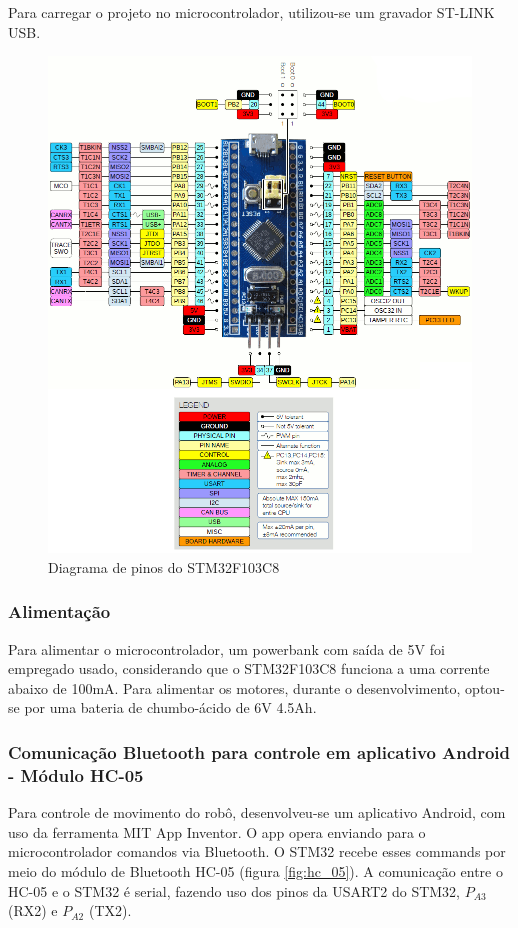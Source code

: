 Para carregar o projeto no microcontrolador, utilizou-se um gravador ST-LINK USB.

\begin{figure}[htb]
	\centering
	\includegraphics[width=1.0\textwidth]{figures/stm32f1_pinout}
	\caption{Diagrama de pinos do STM32F103C8}
\end{figure}

\subsubsection{Alimentação}
Para alimentar o microcontrolador, um powerbank com saída de 5V foi empregado usado, considerando que o STM32F103C8 
funciona a uma corrente abaixo de 100mA. Para alimentar os motores, durante o desenvolvimento, optou-se por uma 
bateria de chumbo-ácido de 6V 4.5Ah.

\subsubsection{Comunicação Bluetooth para controle em aplicativo Android - Módulo HC-05}
Para controle de movimento do robô, desenvolveu-se um aplicativo Android, com uso da ferramenta MIT App Inventor. O app opera enviando para o microcontrolador comandos via Bluetooth. O STM32 recebe esses commands por meio 
do módulo de Bluetooth HC-05 (figura \ref{fig:hc_05}). A comunicação entre o HC-05 e o STM32 é serial, fazendo uso 
dos pinos da USART2 do STM32, $P_{A3}$ (RX2) e $P_{A2}$ (TX2).

